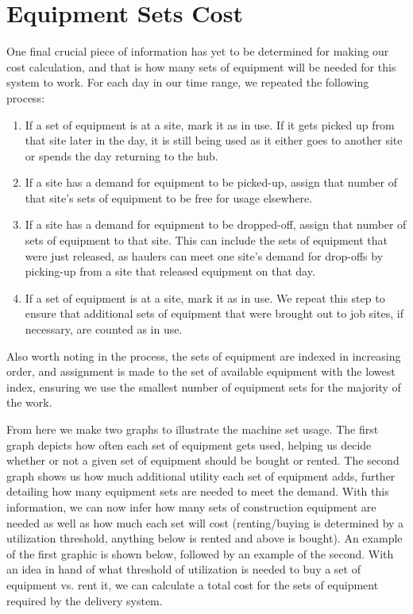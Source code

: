 \documentclass[letterpaper,10pt,english]{sphinxmanual}
\begin{document}
\section{Equipment Sets Cost}
\label{\detokenize{reporting:equipment-sets-cost}}
One final crucial piece of information has yet to be determined for making
our cost calculation, and that is how many sets of equipment will be needed
for this system to work. For each day in our time range, we repeated the
following process:
\begin{enumerate}
\item {} 
If a set of equipment is at a site, mark it as in use. If it gets
picked up from that site later in the day, it is still being used as it
either goes to another site or spends the day returning to the hub.

\item {} 
If a site has a demand for equipment to be picked-up, assign that
number of that site's sets of equipment to be free for usage elsewhere.

\item {} 
If a site has a demand for equipment to be dropped-off, assign that
number of sets of equipment to that site. This can include
the sets of equipment that were just released, as haulers can meet one
site's demand for drop-offs by picking-up from a site that released
equipment on that day.

\item {} 
If a set of equipment is at a site, mark it as in use. We repeat this
step to ensure that additional sets of equipment that were brought out
to job sites, if necessary, are counted as in use.

\end{enumerate}

Also worth noting in the process, the sets of equipment are indexed in
increasing order, and assignment is made to the set of available equipment
with the lowest index, ensuring we use the smallest number of equipment sets
for the majority of the work.

From here we make two graphs to illustrate the machine set usage. The first
graph depicts how often each set of equipment gets used, helping us decide
whether or not a given set of equipment should be bought or rented. The
second graph shows us how much additional utility each set of equipment adds,
further detailing how many equipment sets are needed to meet the demand. With
this information, we can now infer how many sets of construction equipment
are needed as well as how much each set will cost (renting/buying is determined
by a utilization threshold, anything below is rented and above is bought). An
example of the first graphic is shown below, followed by an example of the
second. With an idea in hand of what threshold of utilization is needed to buy
a set of equipment vs. rent it, we can calculate a total cost for the sets of
equipment required by the delivery system.
\end{document}
